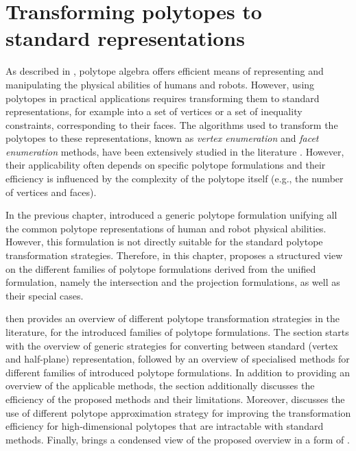 

\chapter{Transforming polytopes to standard representations}
\label{ch:transformin_polytopes}

As described in , polytope algebra offers efficient means of representing and manipulating the physical abilities of humans and robots. However, using polytopes in practical applications requires transforming them to standard representations, for example into a set of vertices or a set of inequality constraints, corresponding to their faces. The algorithms used to transform the polytopes to these representations, known as \textit{vertex enumeration} and \textit{facet enumeration} methods, have been extensively studied in the literature \cite{fukuda2004frequently}. However, their applicability often depends on specific polytope formulations and their efficiency is influenced by the complexity of the polytope itself (e.g., the number of vertices and faces).

In the previous chapter,  introduced a generic polytope formulation unifying all the common polytope representations of human and robot physical abilities. However, this formulation is not directly suitable for the standard polytope transformation strategies. Therefore, in this chapter,  proposes a structured view on the different families of polytope formulations derived from the unified formulation, namely the intersection and the projection formulations, as well as their special cases. 

 then provides an overview of different polytope transformation strategies in the literature, for the introduced families of polytope formulations. The section starts with the overview of generic strategies for converting between standard (vertex and half-plane) representation, followed by an overview of specialised methods for different families of introduced polytope formulations. In addition to providing an overview of the applicable methods, the section additionally discusses the efficiency of the proposed methods and their limitations. Moreover,  discusses the use of different polytope approximation strategy for improving the transformation efficiency for high-dimensional polytopes that are intractable with standard methods. Finally,  brings a condensed view of the proposed overview in a form of .

